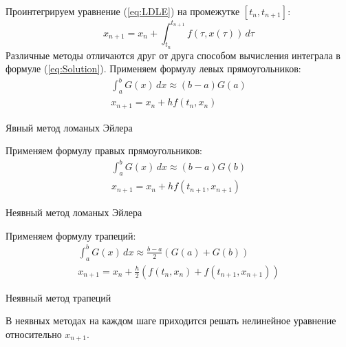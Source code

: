 \documentclass[a4paper,11pt]{article}
\begin{document}
Проинтегрируем уравнение (\ref{eq:LDLE}) на промежутке $[t_n, t_{n+1}]$:
\begin{equation}
  x_{n+1} = x_n + \int_{t_n}^{t_{n+1}} f(\tau, x(\tau))\,d\tau
  \label{eq:Solution}
\end{equation}
Различные методы отличаются друг от друга способом вычисления интеграла в формуле (\ref{eq:Solution}).
Применяем формулу левых прямоугольников:
\begin{gather*}
  \int_a^b G(x)\,dx \approx (b-a)G(a) \\
  x_{n+1} = x_n + hf(t_n, x_n)
\end{gather*}
\begin{center}
  \small{Явный метод ломаных Эйлера}
\end{center}
Применяем формулу правых прямоугольников:
\begin{gather*}
  \int_a^b G(x)\,dx \approx (b-a)G(b) \\
  x_{n+1} = x_n + hf(t_{n+1}, x_{n+1})
\end{gather*}
\begin{center}
  \small{Неявный метод ломаных Эйлера}
\end{center}
Применяем формулу трапеций:
\begin{gather*}
  \int_a^b G(x)\,dx \approx \frac{b-a}{2}(G(a) + G(b)) \\
  x_{n+1} = x_n + \frac{h}{2}(f(t_n, x_n) + f(t_{n+1}, x_{n+1}))
\end{gather*}
\begin{center}
  \small{Неявный метод трапеций}
\end{center}
В неявных методах на каждом шаге приходится решать нелинейное уравнение относительно $x_{n+1}$.
\end{document}
